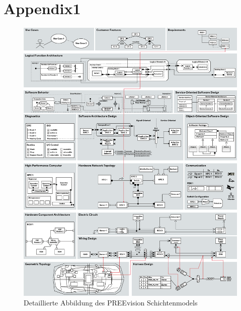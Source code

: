 
\chapter{Appendix1}

\begin{figure}[h!]
  \includegraphics[width=\linewidth,height=0.95\textheight]{figures/Appendix/PREEvision_layer-model_06-2025.png}
  \caption{Detaillierte Abbildung des PREEvision Schichtenmodels}
  \label{appendix:preevision_layer_model}
\end{figure}